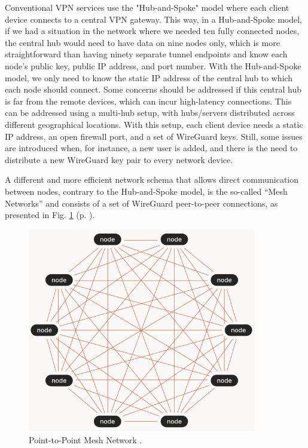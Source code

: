 Conventional VPN services use the "Hub-and-Spoke" model where each client device connects to a central VPN gateway. This way, in a Hub-and-Spoke model, if we had a situation in the network where we needed ten fully connected nodes, the central hub would need to have data on nine nodes only, which is more straightforward than having ninety separate tunnel endpoints and know each node's public key, public IP address, and port number. With the Hub-and-Spoke model, we only need to know the static IP address of the central hub to which each node should connect. Some concerns should be addressed if this central hub is far from the remote devices, which can incur high-latency connections. This can be addressed using a multi-hub setup, with hubs/servers distributed across different geographical locations. With this setup, each client device needs a static IP address, an open firewall port, and a set of WireGuard keys. Still, some issues are introduced when, for instance, a new user is added, and there is the need to distribute a new WireGuard key pair to every network device.

A different and more efficient network schema that allows direct communication between nodes, contrary to the Hub-and-Spoke model, is the so-called ``Mesh Networks'' and consists of a set of WireGuard peer-to-peer connections, as presented in Fig. \ref{fig:tailscale_mesh} (p. \pageref{fig:tailscale_mesh}).

\begin{figure}[H]
    \includegraphics[width=10cm]{figures/tailscale_meshnetwork.png}
    \caption{Point-to-Point Mesh Network \cite{tailscale_docs_ref}.}
    \label{fig:tailscale_mesh}
\end{figure}

